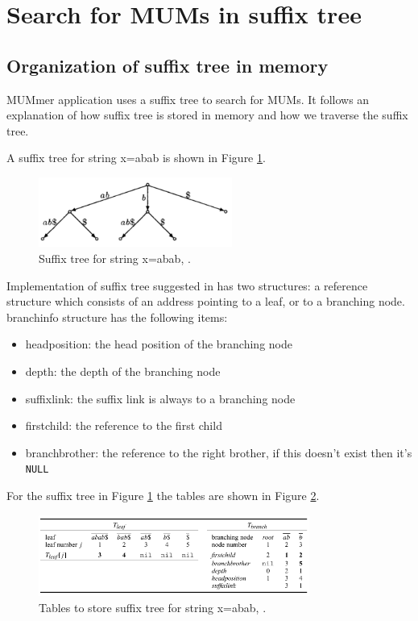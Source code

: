 \documentclass[conference]{IEEEtran}
\begin{document}
\section{Search for MUMs in suffix tree}
\label{search}
 \subsection{Organization of suffix tree in memory}
MUMmer application uses a suffix tree to search for MUMs. It follows an explanation of how suffix tree is stored in memory and how we traverse the suffix tree.

A suffix tree for string x=abab is shown in Figure \ref{suftree}.  
\begin{figure}[hbtp]
\centering
\includegraphics[width=2.5in]{st.png}
\caption{Suffix tree for string x=abab, \cite{Kurtz1999}.}
\label{suftree}
\end{figure}

Implementation of suffix tree suggested in \cite{Kurtz1999} has two structures: a reference structure which consists of an address pointing to a leaf, or to a branching node. branchinfo structure has the following items:
\begin{itemize}
  \item headposition: the head position of the branching node
  \item depth: the depth of the branching node
  \item suffixlink: the suffix link is always to a branching node
  \item firstchild: the reference to the first child
  \item branchbrother: the reference to the right brother, if this doesn't exist then it's \texttt{NULL}
\end{itemize}

 For the suffix tree in Figure \ref{suftree} the tables are shown in Figure \ref{tables}. 
\begin{figure}[!t]
\centering
\includegraphics[width=3.5in]{tables.png}
\caption{Tables to store suffix tree for string x=abab, \cite{Kurtz1999}.}
\label{tables}
\end{figure}
\end{document}

